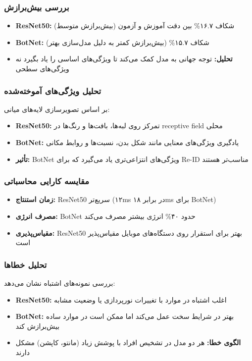 \documentclass[12pt,a4paper]{article}
\theoremstyle{definition}
\begin{document}
\subsubsection*{بررسی بیش‌برازش}
\begin{itemize}
    \item \textbf{ResNet50:} شکاف ۱۶.۷\% بین دقت آموزش و آزمون (بیش‌برازش متوسط)
    \item \textbf{BotNet:} شکاف ۱۵.۷\% (بیش‌برازش کمتر به دلیل مدل‌سازی بهتر)
    \item \textbf{تحلیل:} توجه جهانی به مدل کمک می‌کند تا ویژگی‌های اساسی را یاد بگیرد نه ویژگی‌های سطحی
\end{itemize}

\subsubsection*{تحلیل ویژگی‌های آموخته‌شده}
بر اساس تصویرسازی لایه‌های میانی:
\begin{itemize}
    \item \textbf{ResNet50:} تمرکز روی لبه‌ها، بافت‌ها و رنگ‌ها در receptive field محلی
    \item \textbf{BotNet:} یادگیری ویژگی‌های معنایی مانند شکل بدن، نسبت‌ها و روابط مکانی
    \item \textbf{تأثیر:} BotNet ویژگی‌های انتزاعی‌تری یاد می‌گیرد که برای Re-ID مناسب‌تر هستند
\end{itemize}

\subsubsection*{مقایسه کارایی محاسباتی}
\begin{itemize}
    \item \textbf{زمان استنتاج:} ResNet50 سریع‌تر (۱۲ms در برابر ۱۸ms برای BotNet)
    \item \textbf{مصرف انرژی:} BotNet حدود ۴۰\% انرژی بیشتر مصرف می‌کند
    \item \textbf{مقیاس‌پذیری:} ResNet50 بهتر برای استقرار روی دستگاه‌های موبایل مقیاس‌پذیر است
\end{itemize}

\subsubsection*{تحلیل خطاها}
بررسی نمونه‌های اشتباه نشان می‌دهد:
\begin{itemize}
    \item \textbf{ResNet50:} اغلب اشتباه در موارد با تغییرات نورپردازی یا وضعیت مشابه
    \item \textbf{BotNet:} بهتر در شرایط سخت عمل می‌کند اما ممکن است در موارد ساده بیش‌برازش کند
    \item \textbf{الگوی خطا:} هر دو مدل در تشخیص افراد با پوشش زیاد (مانتو، کاپشن) مشکل دارند
\end{itemize}
\end{document}
